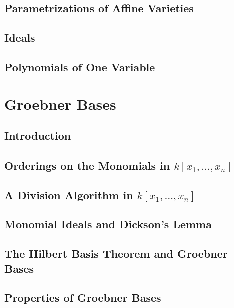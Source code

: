 \subsection{Parametrizations of Affine Varieties}


\subsection{Ideals}



\subsection{Polynomials of One Variable}




\section{Groebner Bases}

\subsection{Introduction}




\subsection{Orderings on the Monomials in $k[x_1, \dots , x_n]$ }




\subsection{A Division Algorithm in $k[x_1, \dots , x_n ]$ }



\subsection{Monomial Ideals and Dickson's Lemma }


\subsection{The Hilbert Basis Theorem and Groebner Bases}


\subsection{Properties of Groebner Bases}



